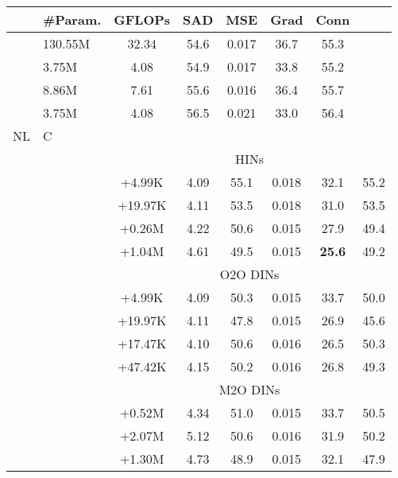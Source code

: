 \documentclass[10pt,twocolumn,letterpaper]{article}
\begin{document}
\begin{table}[!t] \footnotesize
	\captionsetup{font=small,singlelinecheck=true}
	\centering
\renewcommand\arraystretch{1.0}
\begin{tabular}{>{\centering}p{.3cm}|>{\centering}p{.3cm}|c|c|c|c|c|c}
			\hline
			\multicolumn{2}{c|}{Method} 				& \#Param. & GFLOPs & SAD & MSE & Grad & Conn\\
			\hline
			\multicolumn{2}{l|}{B3~\cite{xu2017deep}} 	& 130.55M & 32.34 & 54.6 & 0.017 & 36.7 & 55.3 \\
			\multicolumn{2}{l|}{B11} 					& 3.75M	  & 4.08  & 54.9 & 0.017 & 33.8 & 55.2 \\
			\multicolumn{2}{l|}{B11-1.4} 				& 8.86M	  & 7.61  & 55.6 & 0.016 & 36.4 & 55.7 \\
			\multicolumn{2}{l|}{HMI} 					& 3.75M   & 4.08  & 56.5 & 0.021 & 33.0 & 56.4 \\
			\hline
			NL & C &  \\
			\hline
			& & \multicolumn{6}{c}{HINs}\\
			\hline
			& 									 		& +4.99K  & 4.09  & 55.1 & 0.018 & 32.1 & 55.2\\
			& \checkmark                                & +19.97K & 4.11  & 53.5 & 0.018 & 31.0 & 53.5\\
			\checkmark & 						 		& +0.26M  & 4.22  & 50.6 & 0.015 & 27.9 & 49.4\\
			\checkmark & \checkmark 			 		& +1.04M  & 4.61  & 49.5 & 0.015 & \textbf{25.6} & 49.2\\
			\hline
			& & \multicolumn{6}{c}{O2O DINs}\\
			\hline
			&          					                & +4.99K  & 4.09  & 50.3 & 0.015 & 33.7 & 50.0\\
			& \checkmark                                & +19.97K & 4.11  & 47.8 & 0.015 & 26.9 & 45.6\\
			\checkmark &            	                & +17.47K & 4.10  & 50.6 & 0.016 & 26.5 & 50.3\\
			\checkmark & \checkmark 	                & +47.42K & 4.15  & 50.2 & 0.016 & 26.8 & 49.3\\
			\hline
			& & \multicolumn{6}{c}{M2O DINs}\\
			\hline
			&          				             		& +0.52M & 4.34   & 51.0 & 0.015 & 33.7 & 50.5\\
			& \checkmark                                & +2.07M & 5.12   & 50.6 & 0.016 & 31.9 & 50.2\\
			\checkmark &                         		& +1.30M & 4.73   & 48.9 & 0.015 & 32.1 & 47.9\\

\end{tabular}
\end{table}
\end{document}
